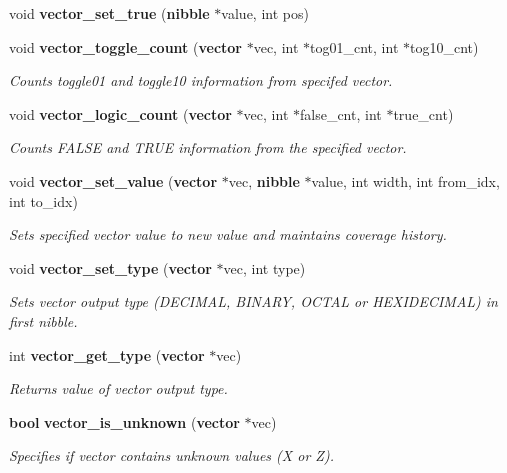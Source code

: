 \begin{CompactItemize}
\item 
void {\bf vector\_\-set\_\-true} ({\bf nibble} $\ast$value, int pos)
\item 
void {\bf vector\_\-toggle\_\-count} ({\bf vector} $\ast$vec, int $\ast$tog01\_\-cnt, int $\ast$tog10\_\-cnt)
\begin{CompactList}\small\item\em Counts toggle01 and toggle10 information from specifed vector. \item\end{CompactList}\item 
void {\bf vector\_\-logic\_\-count} ({\bf vector} $\ast$vec, int $\ast$false\_\-cnt, int $\ast$true\_\-cnt)
\begin{CompactList}\small\item\em Counts FALSE and TRUE information from the specified vector. \item\end{CompactList}\item 
void {\bf vector\_\-set\_\-value} ({\bf vector} $\ast$vec, {\bf nibble} $\ast$value, int width, int from\_\-idx, int to\_\-idx)
\begin{CompactList}\small\item\em Sets specified vector value to new value and maintains coverage history. \item\end{CompactList}\item 
void {\bf vector\_\-set\_\-type} ({\bf vector} $\ast$vec, int type)
\begin{CompactList}\small\item\em Sets vector output type (DECIMAL, BINARY, OCTAL or HEXIDECIMAL) in first nibble. \item\end{CompactList}\item 
int {\bf vector\_\-get\_\-type} ({\bf vector} $\ast$vec)
\begin{CompactList}\small\item\em Returns value of vector output type. \item\end{CompactList}\item 
{\bf bool} {\bf vector\_\-is\_\-unknown} ({\bf vector} $\ast$vec)
\begin{CompactList}\small\item\em Specifies if vector contains unknown values (X or Z). \item\end{CompactList}\item 

\end{CompactItemize}
